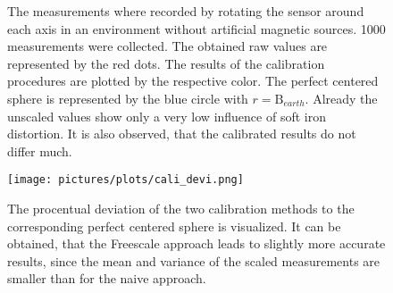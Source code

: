 \begin{figure}[!htb]
\centering
	\hfill
\caption[2D representation of the raw calibration measurements]{
The measurements where recorded by rotating the sensor around each axis in an environment without artificial magnetic sources. 1000 measurements were collected. The obtained raw values are represented by the red dots. The results of the calibration procedures are plotted by the respective color. The perfect centered sphere is represented by the blue circle with $ r=\mathrm{B}_{earth} $. Already the unscaled values show only a very low influence of soft iron distortion. It is also observed, that the calibrated results do not differ much.}
\label{fig:hs2d}
\end{figure}
\begin{figure}[!htb]
\centering
\texttt{[image: pictures/plots/cali\_devi.png]}
\caption[Deviation of the calibrated measurements to the perfect centered sphere]
{The procentual deviation of the two calibration methods to the corresponding perfect centered sphere is visualized. It can be obtained, that the Freescale approach leads to slightly more accurate results, since the mean and variance of the scaled measurements are smaller than for the naive approach.}
\label{fig:devi}
\end{figure}

